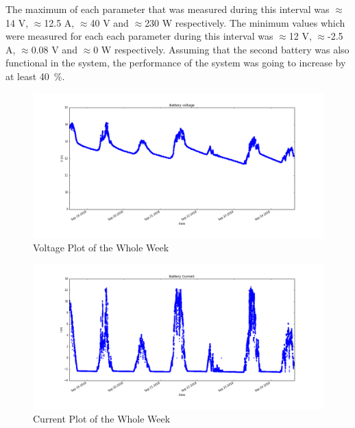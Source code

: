 \documentclass[12pt,a4paper]{report}
\begin{document}
The maximum of each parameter that was measured during this interval was $\approx$14 V, $\approx$12.5 A, $\approx$40 V and $\approx$230 W respectively. The minimum values which were measured for each each parameter during this interval was $\approx$12 V, $\approx$-2.5 A, $\approx$0.08 V and $\approx$0 W respectively. Assuming that the second battery was also functional in the system, the performance of the system was going to increase by at least \SI{40}{\percent}. 

\begin{figure}[h!]
	\begin{center}
		\includegraphics[width=1\linewidth]{Figures/V.png}
		\caption{Voltage Plot of the Whole Week}
		\label{Fig:V}
	\end{center}
\end{figure}

\begin{figure}[h!]
	\begin{center}
		\includegraphics[width=1\linewidth]{Figures/I.png}
		\caption{Current Plot of the Whole Week}
		\label{Fig:I}
	\end{center}
\end{figure}
\end{document}
